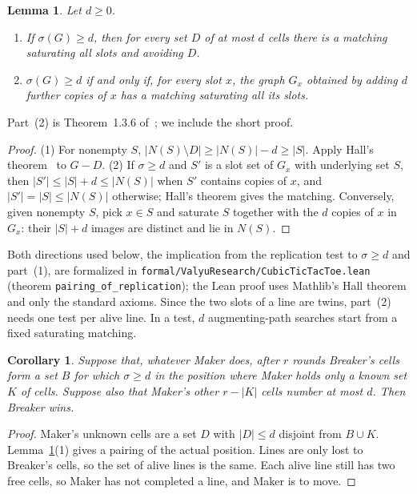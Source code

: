 \documentclass[11pt]{amsart}
\newtheorem{lemma}[theorem]{Lemma}
\newtheorem{corollary}[theorem]{Corollary}
\theoremstyle{definition}
\theoremstyle{remark}
\begin{document}
\begin{lemma}\label{lem:surplus}
Let $d\ge0$.
\begin{enumerate}
\item If $\sigma(G)\ge d$, then for every set $D$ of at most $d$ cells there is a matching saturating all slots and avoiding $D$.
\item $\sigma(G)\ge d$ if and only if, for every slot $x$, the graph $G_x$ obtained by adding $d$ further copies of $x$ has a matching saturating all its slots.
\end{enumerate}
\end{lemma}

Part~(2) is Theorem~1.3.6 of~\cite{LovaszPlummer1986}; we include the short proof.

\begin{proof}
(1) For nonempty $S$, $|N(S)\setminus D|\ge |N(S)|-d\ge|S|$. Apply Hall's theorem~\cite{Hall1935} to $G-D$.
(2) If $\sigma\ge d$ and $S'$ is a slot set of $G_x$ with underlying set $S$, then $|S'|\le|S|+d\le|N(S)|$ when $S'$ contains copies of $x$, and $|S'|=|S|\le |N(S)|$ otherwise; Hall's theorem gives the matching. Conversely, given nonempty $S$, pick $x\in S$ and saturate $S$ together with the $d$ copies of $x$ in $G_x$: their $|S|+d$ images are distinct and lie in $N(S)$.
\end{proof}

Both directions used below, the implication from the replication test to $\sigma\ge d$ and part~(1), are formalized in \texttt{formal/ValyuResearch/CubicTicTacToe.lean} (theorem \texttt{pairing\_of\_replication}); the Lean proof uses Mathlib's Hall theorem and only the standard axioms. Since the two slots of a line are twins, part~(2) needs one test per alive line. In a test, $d$ augmenting-path searches start from a fixed saturating matching.

\begin{corollary}\label{cor:unknown}
Suppose that, whatever Maker does, after $r$ rounds Breaker's cells form a set $B$ for which $\sigma\ge d$ in the position where Maker holds only a known set $K$ of cells. Suppose also that Maker's other $r-|K|$ cells number at most $d$. Then Breaker wins.
\end{corollary}

\begin{proof}
Maker's unknown cells are a set $D$ with $|D|\le d$ disjoint from $B\cup K$. Lemma~\ref{lem:surplus}(1) gives a pairing of the actual position. Lines are only lost to Breaker's cells, so the set of alive lines is the same. Each alive line still has two free cells, so Maker has not completed a line, and Maker is to move.
\end{proof}
\end{document}
